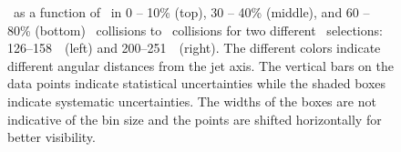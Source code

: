 \begin{figure}
   \caption{\RDptr\ as a function of \pt\ in  0 -- 10\% (top), 30 -- 40\% (middle), and 60 -- 80\% (bottom) \PbPb\ collisions to \pp\ collisions for two different \ptjet\ selections: 126--158~\GeV\ (left) and 200--251~\GeV\ (right). The different colors indicate different angular distances from the jet axis. The vertical bars on the data points indicate statistical uncertainties while the shaded boxes indicate systematic uncertainties. The widths of the boxes are not indicative of the bin size and the points are shifted horizontally for better visibility.}
      \label{fig:pttrkdep}
\end{figure}






\FloatBarrier
